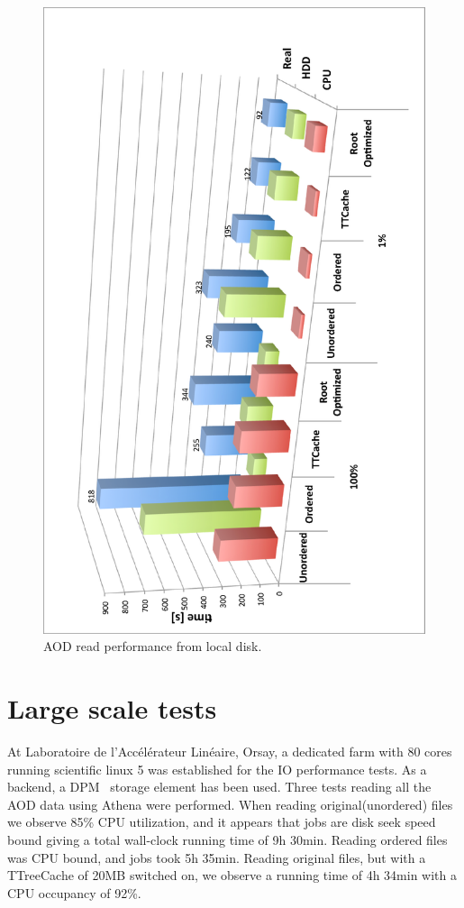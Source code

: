 \documentclass[a4paper]{jpconf}
\begin{document}
\begin{figure}[h]
\begin{center}	
\includegraphics[scale=0.5, angle=-90]{LOCAL_AOD.eps}
\end{center}
\caption{\label{fig_LOCAL_AOD}AOD read performance from local disk. }
\end{figure}



\section{Large scale tests}

At Laboratoire de l'Acc\'{e}l\'{e}rateur Lin\'{e}aire, Orsay, a dedicated farm with 80 cores running scientific linux 5 was established for the IO performance tests. As a backend, a DPM~\cite{dpm} storage element has been used.  Three tests reading all the AOD data using Athena were performed. When reading original(unordered) files we observe 85\% CPU utilization, and it appears that jobs are disk seek speed bound giving a total wall-clock running time of 9h 30min. Reading ordered files was CPU bound, and jobs took 5h 35min. Reading original files, but with a TTreeCache of 20MB switched on, we observe a running time of 4h 34min with a CPU occupancy of 92\%.     
\end{document}
